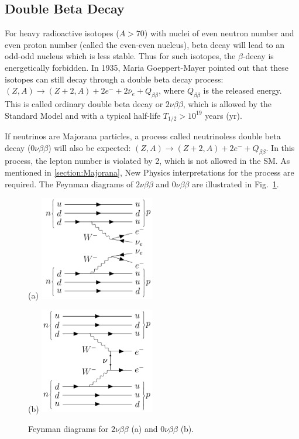 \subsection{Double Beta Decay}

For heavy radioactive isotopes ($A>70$) with nuclei of even neutron number and even proton number (called the even-even nucleus), beta decay will lead to an odd-odd nucleus which is less stable. Thus for such isotopes, the $\beta$-decay is energetically forbidden. In 1935, Maria Goeppert-Mayer pointed out that these isotopes can still decay through a double beta decay process: $(Z,A) \to (Z+2,A)+2e^{-}+2\bar{\nu}_e+Q_{\beta\beta}$, where $Q_{\beta\beta}$ is the released energy. This is called ordinary double beta decay or $2\nu\beta\beta$, which is allowed by the Standard Model and with a typical half-life $T_{1/2}>10^{19}$ years (yr)\cite{povh2008particles,martin2019nuclear}.

If neutrinos are Majorana particles, a process called neutrinoless double beta decay ($0\nu\beta\beta$) will also be expected: $(Z,A) \to (Z+2,A)+2e^{-}+Q_{\beta\beta}$. In this process, the lepton number is violated by 2, which is not allowed in the SM. As mentioned in \ref{section:Majorana}, New Physics interpretations for the process are required. The Feynman diagrams of $2\nu\beta\beta$ and $0\nu\beta\beta$ are illustrated in Fig.~\ref{feynman1}.
\begin{figure}[htbp]
	\centering
	{	
	\begin{minipage}[t]{0.45\textwidth}{(a)}
		\includegraphics[width=5cm]{doubleBeta2nu_feynman.png}
	\end{minipage}
	\begin{minipage}[t]{0.45\textwidth}{(b)}
		\includegraphics[width=5cm]{doubleBeta_feynman.png}
	\end{minipage}
	\caption{ Feynman diagrams for $2\nu\beta\beta$ (a) and $0\nu\beta\beta$ (b).}
	\label{feynman1}
}
\end{figure}

